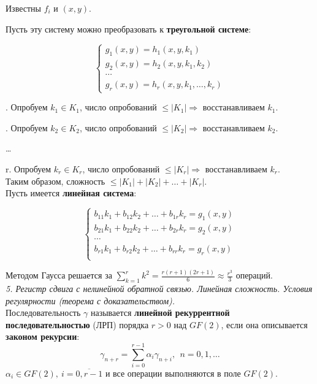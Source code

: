 \noindent Известны $f_i$ и $(x, y)$.

Пусть эту систему можно преобразовать к \textbf{треугольной системе}:

\begin{equation*}
    \begin{cases}
    g_1 (x, y) = h_1 (x, y, k_1) \\
    g_2 (x, y) = h_2 (x, y, k_1, k_2) \\
    \cdots \\
    g_r (x, y) = h_r (x, y, k_1, \ldots, k_r) 
    \end{cases}
\end{equation*}

. Опробуем $k_1 \in K_1$, число опробований $\le |K_1| \Rightarrow$ восстанавливаем $k_1$.

. Опробуем $k_2 \in K_2$, число опробований $\le |K_2| \Rightarrow$ восстанавливаем $k_2$.

\noindent \ldots

\noindent r. Опробуем $k_r \in K_r$, число опробований $\le |K_r| \Rightarrow$ восстанавливаем $k_r$. \\

\noindent Таким образом, сложность $\le |K_1| + |K_2| + \ldots + |K_r|$. \\

Пусть имеется \textbf{линейная система}:

\begin{equation*}
    \begin{cases}
    b_{11} k_1 + b_{12} k_2 + \ldots + b_{1r} k_r = g_1 (x, y)  \\
    b_{21} k_1 + b_{22} k_2 + \ldots + b_{2r} k_r = g_2 (x, y)  \\
    \cdots \\
    b_{r1} k_1 + b_{r2} k_2 + \ldots + b_{rr} k_r = g_r (x, y)  \\
    \end{cases}
\end{equation*}

\noindent Методом Гаусса решается за $\sum_{k=1}^r k^2 = \frac{r(r + 1)(2 r + 1)}{6} \approx \frac{r^3}{3}$ операций. \\

\noindent \textit{5. Регистр сдвига с нелинейной обратной связью. Линейная сложность. Условия регулярности (теорема с доказательством).} \\

Последовательность $\gamma$ называется \textbf{линейной рекуррентной последовательностью} (ЛРП) порядка $r > 0$ над $GF(2)$, если она описывается \textbf{законом рекурсии}:
$$\gamma_{n+r} = \sum_{i=0}^{r-1} \alpha_i \gamma_{n+i},\ \ n = 0,1,\ldots$$
\noindent $\alpha_i \in GF(2),\ i= \overline{0,r-1}$ и все операции выполняются в поле $GF(2)$.

